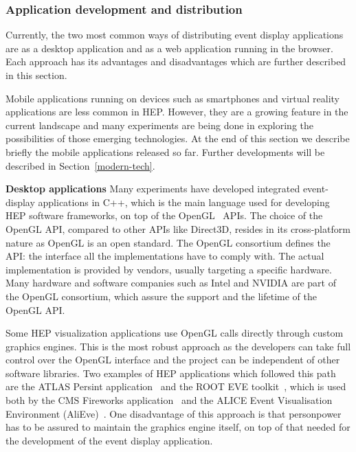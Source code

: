 \documentclass[12pt,a4paper]{article}
\begin{document}

\hypertarget{application-development}{%
\subsubsection{Application development and distribution}\label{application-development}}

Currently, the two most common ways of distributing event display applications are as a desktop application and as a web
application running in the browser. Each approach has its advantages and disadvantages which are further described in this section.

Mobile applications running on devices such as smartphones and virtual reality applications are less common in HEP. However, they are a growing feature in the current landscape and many experiments are being done in exploring the possibilities of those emerging technologies. At the end of this section we describe briefly the mobile applications released so far. Further developments will be described in
Section~\ref{modern-tech}.

{\bf Desktop applications} Many experiments have developed integrated event-display applications in C++, which is the main language used for developing
HEP software frameworks, on top of the OpenGL~\cite{OpenGL1992} APIs.
The choice of the OpenGL API, compared to other APIs like Direct3D, resides in its cross-platform nature as
OpenGL is an open standard. The OpenGL consortium defines the API: the interface all the implementations have to
comply with. The actual implementation is provided by vendors, usually targeting a specific hardware. Many hardware and
software companies such as Intel and NVIDIA are part of the OpenGL consortium, which assure
the support and the lifetime of the OpenGL API.

Some HEP visualization applications use OpenGL calls directly through custom graphics engines. This is the most
robust approach as the developers can take full control over the OpenGL interface
and the project can be independent of other software libraries. Two examples of  HEP applications which followed this path are the
ATLAS Persint application~\cite{ATLASPersint2012} and the ROOT EVE toolkit~\cite{ROOTEVE2007}, which is used both by the CMS
Fireworks application~\cite{CMSFireworks} and the ALICE Event Visualisation Environment (AliEve)~\cite{alieve}.
One disadvantage of this approach is that personpower has to be assured to maintain the graphics engine itself, on top of that needed for the development of the event display application.
\end{document}
